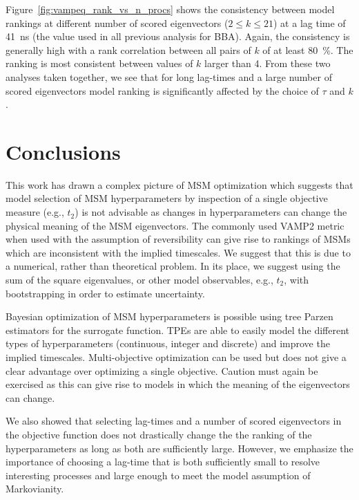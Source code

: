 \documentclass[journal=jacsat,manuscript=article]{achemso}
\begin{document}
Figure~\ref{fig:vampeq_rank_vs_n_procs} shows the consistency between model rankings at different number of scored eigenvectors ($2{\le}k{\le}21$) at a lag time of \SI{41}{\nano\second} (the value used in all previous analysis for BBA). Again, the consistency is generally high with a rank correlation between all pairs of $k$ of at least \SI{80}{\percent}. The ranking is most consistent between values of $k$ larger than \num{4}.  From these two analyses taken together, we see that for long lag-times and a large number of scored eigenvectors model ranking is significantly affected by the choice of $\tau$ and $k$.

\section{Conclusions}

This work has drawn a complex picture of MSM optimization which suggests that model selection of MSM hyperparameters by inspection of a single objective measure (e.g., $t_2$) is not advisable as changes in hyperparameters can change the physical meaning of the MSM eigenvectors. The commonly used VAMP2 metric when used with the assumption of reversibility can give rise to rankings of MSMs which are inconsistent with the implied timescales. We suggest that this is due to a numerical, rather than theoretical problem. In its place, we suggest using the sum of the square eigenvalues, or other model observables, e.g., $t_2$, with bootstrapping in order to estimate uncertainty.  

Bayesian optimization of MSM hyperparameters is possible using tree Parzen estimators for the surrogate function.  TPEs are able to easily model the different types of hyperparameters (continuous, integer and discrete) and improve the implied timescales. Multi-objective optimization can be used but does not give a clear advantage over optimizing a single objective.  Caution must again be exercised as this can give rise to models in which the meaning of the eigenvectors can change. 

We also showed that selecting lag-times and a number of scored eigenvectors in the objective function does not drastically change the the ranking of the hyperparameters as long as both are sufficiently large. However, we emphasize the importance of  choosing a lag-time that is both sufficiently small to resolve interesting processes and large enough to meet the model assumption of Markovianity.  
\end{document}
